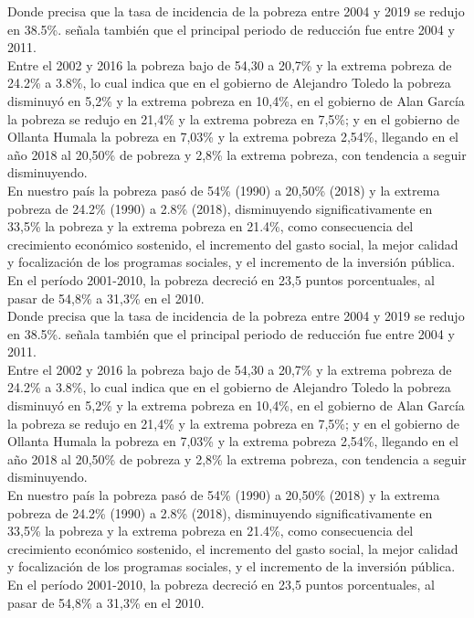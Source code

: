 Donde precisa que la tasa de incidencia de la pobreza entre 2004 y 2019 se redujo en 38.5\%. señala también que el principal periodo de reducción fue entre 2004 y 2011. \\ 
Entre el 2002 y 2016 la pobreza bajo de 54,30 a 20,7\% y la extrema pobreza de 24.2\% a 3.8\%, lo cual indica que en el gobierno de Alejandro Toledo la pobreza disminuyó en 5,2\% y la extrema pobreza en 10,4\%, en el gobierno de Alan García la pobreza se redujo en 21,4\% y la extrema pobreza en 7,5\%; y en el gobierno de Ollanta Humala la pobreza en 7,03\% y la extrema pobreza 2,54\%, llegando en el año 2018 al 20,50\% de pobreza y 2,8\% la extrema pobreza, con tendencia a seguir disminuyendo. \\
En nuestro país la pobreza pasó de 54\% (1990) a 20,50\% (2018) y la extrema pobreza de 24.2\% (1990) a 2.8\% (2018), disminuyendo significativamente en 33,5\% la pobreza y la extrema pobreza en 21.4\%, como consecuencia del crecimiento económico sostenido, el incremento del gasto social, la mejor calidad y focalización de los programas sociales, y el incremento de la inversión pública. \\
En el período 2001-2010, la pobreza decreció en 23,5 puntos porcentuales, al pasar de 54,8\% a 31,3\% en el 2010. \\
Donde precisa que la tasa de incidencia de la pobreza entre 2004 y 2019 se redujo en 38.5\%. señala también que el principal periodo de reducción fue entre 2004 y 2011. \\
Entre el 2002 y 2016 la pobreza bajo de 54,30 a 20,7\% y la extrema pobreza de 24.2\% a 3.8\%, lo cual indica que en el gobierno de Alejandro Toledo la pobreza disminuyó en 5,2\% y la extrema pobreza en 10,4\%, en el gobierno de Alan García la pobreza se redujo en 21,4\% y la extrema pobreza en 7,5\%; y en el gobierno de Ollanta Humala la pobreza en 7,03\% y la extrema pobreza 2,54\%, llegando en el año 2018 al 20,50\% de pobreza y 2,8\% la extrema pobreza, con tendencia a seguir disminuyendo. \\
En nuestro país la pobreza pasó de 54\% (1990) a 20,50\% (2018) y la extrema pobreza de 24.2\% (1990) a 2.8\% (2018), disminuyendo significativamente en 33,5\% la pobreza y la extrema pobreza en 21.4\%, como consecuencia del crecimiento económico sostenido, el incremento del gasto social, la mejor calidad y focalización de los programas sociales, y el incremento de la inversión pública.\\
En el período 2001-2010, la pobreza decreció en 23,5 puntos porcentuales, al pasar de 54,8\% a 31,3\% en el 2010.







